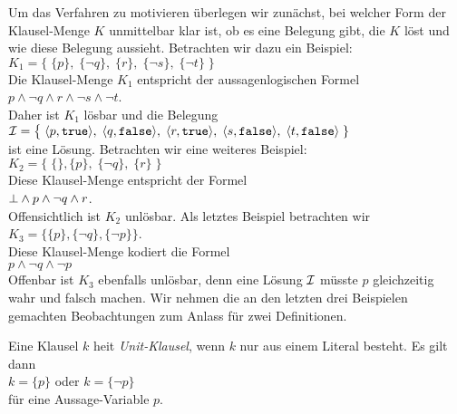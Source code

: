 Um das Verfahren zu motivieren \"{u}berlegen wir zun\"{a}chst, bei welcher Form der Klausel-Menge $K$
unmittelbar klar ist, ob es eine Belegung gibt, die $K$ l\"{o}st und wie diese Belegung
aussieht.  Betrachten wir dazu ein Beispiel: \\[0.2cm]
\hspace*{1.3cm} 
$K_1 = \bigl\{\; \{p\},\; \{\neg q\},\; \{r\},\; \{\neg s\}, \; \{\neg t\} \;\bigr\}$ 
\\[0.2cm]
Die Klausel-Menge $K_1$ entspricht der aussagenlogischen Formel
\\[0.2cm]
\hspace*{1.3cm}
$p \wedge \neg q \wedge r \wedge \neg s \wedge \neg t$.
\\[0.2cm]
Daher ist $K_1$ l\"{o}sbar und die Belegung  \\[0.2cm]
\hspace*{1.3cm} 
$\I = \bigl\{\; \pair(p, \mathtt{true}),\; \pair(q, \mathtt{false}),\;\pair(r, \mathtt{true}),\; \pair(s, \mathtt{false}),\; \pair(t, \mathtt{false})\;\}$
\\[0.2cm]
ist eine L\"{o}sung.  Betrachten wir eine weiteres Beispiel: \\[0.2cm]
\hspace*{1.3cm} 
$K_2 = \bigl\{\; \{\}, \{p\},\; \{\neg q\},\; \{r\}\; \bigr\}$ 
\\[0.2cm]
Diese Klausel-Menge entspricht der Formel
\\[0.2cm]
\hspace*{1.3cm}
$\bot \wedge p \wedge \neg q \wedge r$.
\\[0.2cm]
Offensichtlich ist $K_2$ unl\"{o}sbar.  Als letztes Beispiel betrachten wir 
\\[0.2cm]
\hspace*{1.3cm} $K_3 = \bigl\{ \{p\}, \{\neg q\}, \{\neg p\} \bigr\}$.
\\[0.2cm]
Diese Klausel-Menge kodiert die Formel
\\[0.2cm]
\hspace*{1.3cm}
$p \wedge \neg q \wedge \neg p $
\\[0.2cm]
Offenbar ist $K_3$ ebenfalls unl\"{o}sbar, denn eine L\"{o}sung $\mathcal{I}$ m\"{u}sste $p$ gleichzeitig
wahr und falsch machen.
Wir nehmen die an den letzten drei Beispielen gemachten Beobachtungen zum Anlass f\"{u}r zwei Definitionen.

\begin{Definition}
  Eine Klausel $k$ hei\3t \emph{Unit-Klausel}, wenn $k$ nur aus einem Literal besteht.
  Es gilt dann \\[0.2cm]
  \hspace*{1.3cm} $k = \{p\}$ \quad oder \quad $k = \{\neg p\}$ \\[0.2cm]
  f\"{u}r eine Aussage-Variable $p$. \eox
\end{Definition}

